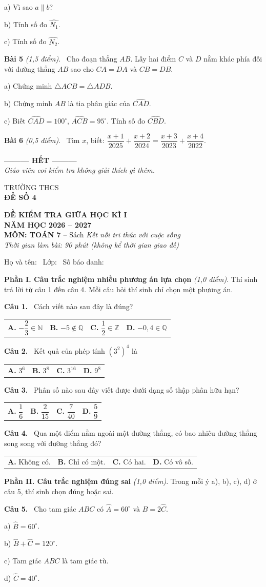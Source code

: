 \documentclass[12pt,a4paper]{article}
\makeatletter
\newcommand{\bonpa}[4]{\par\noindent\begin{tabularx}{\linewidth}{@{\hspace{0.6cm}}XXXX@{}}
\textbf{A.} #1 & \textbf{B.} #2 & \textbf{C.} #3 & \textbf{D.} #4\end{tabularx}\par}
\newcommand{\cau}[1]{\par\medskip\textbf{Câu #1.}~}
\newcommand{\bai}[2]{\par\medskip\textbf{Bài #1} \textit{(#2)}.~}
\newcommand{\y}[1]{\par\hspace*{0.6cm}#1}
\newcommand{\phan}[1]{\par\bigskip{\large\textbf{#1}}\par\smallskip}
\makeatother
\begin{document}
\y{a) Vì sao $a\parallel b$?}
\y{b) Tính số đo $\widehat{N_1}$.}
\y{c) Tính số đo $\widehat{N_2}$.}
\bai{5}{1,5 điểm} Cho đoạn thẳng $AB$. Lấy hai điểm $C$ và $D$ nằm khác phía đối với đường thẳng $AB$ sao cho $CA=DA$ và $CB=DB$.
\y{a) Chứng minh $\triangle ACB=\triangle ADB$.}
\y{b) Chứng minh $AB$ là tia phân giác của $\widehat{CAD}$.}
\y{c) Biết $\widehat{CAD}=100^\circ$, $\widehat{ACB}=95^\circ$. Tính số đo $\widehat{CBD}$.}
\bai{6}{0,5 điểm} Tìm $x$, biết: $\dfrac{x+1}{2025}+\dfrac{x+2}{2024}=\dfrac{x+3}{2023}+\dfrac{x+4}{2022}$.

\bigskip\begin{center}\textbf{--------- HẾT ---------}\\
\textit{Giáo viên coi kiểm tra không giải thích gì thêm.}\end{center}

\newpage
\noindent
\begin{minipage}[t]{0.38\linewidth}\centering
TRƯỜNG THCS \dotfill\\[2pt]
\textbf{ĐỀ SỐ 4}
\end{minipage}\hfill
\begin{minipage}[t]{0.6\linewidth}\centering
\textbf{ĐỀ KIỂM TRA GIỮA HỌC KÌ I}\\
\textbf{NĂM HỌC 2026 -- 2027}\\
\textbf{MÔN: TOÁN 7} -- Sách \textit{Kết nối tri thức với cuộc sống}\\
\textit{Thời gian làm bài: 90 phút (không kể thời gian giao đề)}
\end{minipage}

\medskip
Họ và tên: \dotfill\ Lớp: \makebox[2cm]{\dotfill}\ Số báo danh: \makebox[2.5cm]{\dotfill}
\phan{A. TRẮC NGHIỆM (3,0 điểm)}
\textbf{Phần I. Câu trắc nghiệm nhiều phương án lựa chọn} \textit{(1,0 điểm)}. Thí sinh trả lời từ câu 1 đến câu 4. Mỗi câu hỏi thí sinh chỉ chọn một phương án.
\cau{1} Cách viết nào sau đây là đúng?
\bonpa{$-\dfrac{2}{3}\in\mathbb{N}$}{$-5\notin\mathbb{Q}$}{$\dfrac{1}{2}\in\mathbb{Z}$}{$-0{,}4\in\mathbb{Q}$}
\cau{2} Kết quả của phép tính $\left(3^{2}\right)^{4}$ là
\bonpa{$3^{6}$}{$3^{8}$}{$3^{16}$}{$9^{8}$}
\cau{3} Phân số nào sau đây viết được dưới dạng số thập phân hữu hạn?
\bonpa{$\dfrac{1}{6}$}{$\dfrac{2}{15}$}{$\dfrac{7}{40}$}{$\dfrac{5}{9}$}
\cau{4} Qua một điểm nằm ngoài một đường thẳng, có bao nhiêu đường thẳng song song với đường thẳng đó?
\bonpa{Không có.}{Chỉ có một.}{Có hai.}{Có vô số.}

\medskip\textbf{Phần II. Câu trắc nghiệm đúng sai} \textit{(1,0 điểm)}. Trong mỗi ý a), b), c), d) ở câu 5, thí sinh chọn đúng hoặc sai.
\cau{5} Cho tam giác $ABC$ có $\widehat{A}=60^\circ$ và $\widehat{B}=2\widehat{C}$.
\y{a) $\widehat{B}=60^\circ$.}
\y{b) $\widehat{B}+\widehat{C}=120^\circ$.}
\y{c) Tam giác $ABC$ là tam giác tù.}
\y{d) $\widehat{C}=40^\circ$.}
\end{document}
